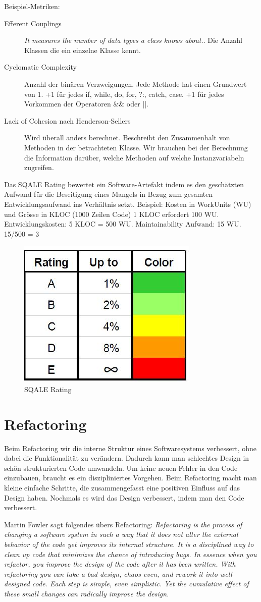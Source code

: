 Beispiel-Metriken:
\begin{description}
	\item[Efferent Couplings] \textit{It measures the number of data types a class knows about.}. Die Anzahl Klassen die ein einzelne Klasse kennt.
	
	\item[Cyclomatic Complexity] Anzahl der binären Verzweigungen. Jede Methode hat einen Grundwert von 1. +1 für jedes if, while, do, for, ?:, catch, case. +1 für jedes Vorkommen der Operatoren \&\& oder ||.
	
	\item[Lack of Cohesion nach Henderson-Sellers] Wird überall anders berechnet. Beschreibt den Zusammenhalt von Methoden in der betrachteten Klasse. Wir brauchen bei der Berechnung die Information darüber, welche Methoden auf welche Instanzvariabeln zugreifen.
\end{description}

Das SQALE Rating bewertet ein Software-Artefakt indem es den geschätzten Aufwand für die Beseitigung eines Mangels in Bezug zum gesamten Entwicklungsaufwand ins Verhältnis setzt. Beispiel: Kosten in WorkUnits (WU) und Grösse in KLOC (1000 Zeilen Code) 1 KLOC erfordert 100 WU. Entwicklungskosten: 5 KLOC = 500 WU. Maintainability Aufwand: 15 WU. 15/500 = 3%

\begin{figure}[h!]
\centering
\includegraphics[width=0.1\linewidth]{fig/sqale-rating}
\caption{SQALE Rating}
\label{fig:sqale-rating}
\end{figure}

\section{Refactoring}

Beim Refactoring wir die interne Struktur eines Softwaresystems verbessert, ohne dabei die Funktionalität zu verändern. Dadurch kann man schlechtes Design in schön strukturierten Code umwandeln. Um keine neuen Fehler in den Code einzubauen, braucht es ein diszipliniertes Vorgehen. Beim Refactoring macht man kleine einfache Schritte, die zusammengefasst eine positiven Einfluss auf das Design haben. Nochmals es wird das Design verbessert, indem man den Code verbessert.

Martin Fowler sagt folgendes übers Refactoring: \textit{Refactoring is the process of changing a software system in such a way that it does not alter the external behavior of the code yet improves its internal structure. It is a disciplined way to clean up code that minimizes the chance of introducing bugs. In essence when you refactor, you improve the design of the code after it has been written. With refactoring you can take a bad design, chaos even, and rework it into well-designed code. Each step is simple, even simplistic. Yet the cumulative effect of these small changes can radically improve the design.}

